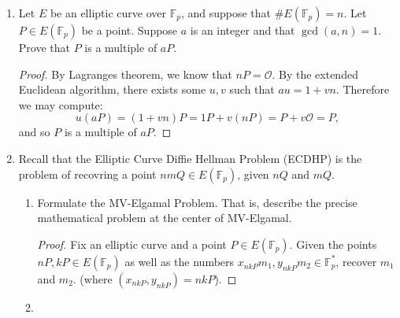 \documentclass[11pt]{article}
\newcommand{\bF}{\mathbb{F}}
\newcommand{\bZ}{\mathbb{Z}}
\newcommand{\cO}{\mathcal{O}}
\begin{document}
\begin{enumerate}
{\begin{enumerate}
\begin{proof}
      This only takes care of the case where $\gcd(a,N)=1$, but of course, otherwise it would be other $p$ or $q$ and we would already have our factorization.  We have therefore showed that the following algorithm works:
      \begin{enumerate}[(1)]
        \item{
        Given $N$ and a way to compute square roots, factor $N$.
        }
        \item{
        Choose nonzero $a\in\bZ/N\bZ$ and compute $g = \gcd(a,N)$.
        }
        \item{
        If $g\not=1$ then return the factors $(g,N/g)$.
        }
        \item{
        Otherwise compute the four square roots $r_1,r_2,r_3,r_4$ of $a$ modulo $N$.
        }
        \item{
        Find $r_i,r_j$ such that $r_i\not=\pm r_j$ modulo $N$.  Then compute $g = \gcd(r_i-r_j,N)$, and return the factors $(g,N/g)$.
        }
      \end{enumerate}
    \end{proof}
  \end{enumerate}
  }
  \item{
  Let $E$ be an elliptic curve over $\bF_p$, and suppose that $\#E(\bF_p) = n$.  Let $P\in E(\bF_p)$ be a point.  Suppose $a$ is an integer and that $\gcd(a,n)=1$.  Prove that $P$ is a multiple of $aP$.
  }
  \begin{proof}
    By Lagranges theorem, we know that $nP = \cO$.  By the extended Euclidean algorithm, there exists some $u,v$ such that $au=1+vn$.  Therefore we may compute:
    \[u(aP) = (1+vn)P = 1P+v(nP) = P + v\cO = P,\]
    and so $P$ is a multiple of $aP$.
  \end{proof}
  \item{
  Recall that the Elliptic Curve Diffie Hellman Problem (ECDHP) is the problem of recovring a point $nmQ\in E(\bF_p)$, given $nQ$ and $mQ$.
  \begin{enumerate}
    \item{
    Formulate the MV-Elgamal Problem.  That is, describe the precise mathematical problem at the center of MV-Elgamal.
    }
    \begin{proof}
      Fix an elliptic curve and a point $P\in E(\bF_p)$.  Given the points $nP,kP\in E(\bF_p)$ as well as the numbers $x_{nkP}^{ }m_1,y^{ }_{nkP}m_2\in\bF_p^*$, recover $m_1$ and $m_2$.  (where $(x_{nkP},y_{nkP})=nkP$).
    \end{proof}
    \item{
}
\end{enumerate}}
\end{enumerate}
\end{document}
